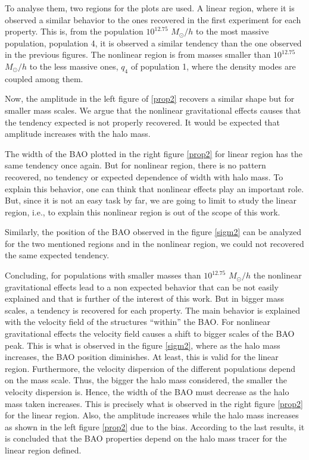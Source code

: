 To analyse them, two regions for the plots are used. A linear region, where it is observed
a similar behavior to the ones recovered in the first experiment for each property. This is, 
from the population $10^{12.75}$ $M_{\odot}/h$ to the most massive population, population 4, it is observed a similar tendency than the one observed in the previous figures. 
The nonlinear region is from masses smaller than $10^{12.75}$ $M_{\odot}/h$ to the less massive 
ones, $q_4$ of population 1, where the density modes are coupled among them. 

Now, the amplitude in the left figure of \ref{prop2} recovers a similar shape but
for smaller mass scales. We argue that the nonlinear gravitational effects causes that the tendency
expected is not properly recovered. It would be expected that amplitude increases with
the halo mass. 

The width of the BAO plotted in the right figure \ref{prop2} for linear region has the 
same tendency once again. But for nonlinear region, there is no pattern recovered, 
no tendency or expected dependence of width with halo mass. To explain this behavior,
one can think that nonlinear effects play an important role. But, since it is not
an easy task by far, we are going to limit to study the linear region, i.e., 
to explain this nonlinear region is out of the scope of this work.

Similarly, the position of the BAO observed in the figure \ref{sigm2} can be analyzed
for the two mentioned regions and in the nonlinear region, we could not recovered the 
same expected tendency. 

Concluding, for populations with smaller masses than $10^{12.75}$ $M_{\odot}/h$ the nonlinear gravitational
effects lead to a non expected behavior that can be not easily explained and that is further
of the interest of this work. But in bigger mass scales, a tendency is recovered for each
property. The main behavior is explained with the velocity field of the structures ``within'' the
BAO. For nonlinear gravitational effects the velocity field causes a shift to bigger scales 
of the BAO peak. This is what is observed in the figure \ref{sigm2}, where as the halo mass 
increases, the BAO position diminishes. At least, this is valid for the linear region. 
Furthermore, the velocity dispersion of the different
populations depend on the mass scale. Thus, the bigger the halo mass considered, the smaller
the velocity dispersion is. Hence, the width of the BAO must decrease as the halo mass taken
increases. This is precisely what is observed in the right figure \ref{prop2} for the linear region. 
Also, the amplitude increases while the halo mass increases as shown in the left 
figure \ref{prop2} due to the bias. 
According to the last results, it is concluded that the BAO properties depend on the 
halo mass tracer for the linear region defined. 

